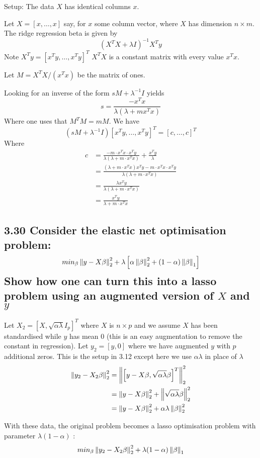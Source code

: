 Setup: The data $X$ has identical columns $x$.

Let $X = [x, \dots, x]$ say, for $x$ some column vector, where $X$ has dimension $n \times m$.
The ridge regression beta is given by 
$$\left(X^T X + \lambda I\right)^{-1} X^T y$$
Note $X^T y = [x^T y, \dots, x^T y]^T$
$X^T X$ is a constant matrix with every value $x^T x$.
 
Let $M = X^T X / (x^T x)$ be the matrix of ones.
 
Looking for an inverse of the form $s M + \lambda^{-1} I$ yields 
$$s = \frac {-x^T x}{\lambda(\lambda + m x^T x)}$$
Where one uses that $M^T M = m M$.
 We have $$(sM + \lambda^{-1} I) [x^T y, \dots, x^T y]^T = [c, \dots, c]^T$$
 Where 
 \begin{align*}
     c &= \frac {-m \cdot x^T x\cdot x^T y}{\lambda (\lambda + m\cdot x^T x)}  + \frac{x^T y}{\lambda}\\
     &= \frac {(\lambda + m\cdot x^T x) x^T y -m \cdot x^T x\cdot x^T y}{\lambda (\lambda + m\cdot x^T x)} \\
     &= \frac {\lambda x^T y}{\lambda (\lambda + m\cdot x^T x)} \\
     &= \frac { x^T y}{ \lambda + m\cdot x^T x} 
 \end{align*}
 
 


\subsection*{3.30 Consider the elastic net optimisation problem:
$$ min_\beta \left\lVert y - X \beta\right\rVert_2^2 + \lambda \left[ \alpha \left\lVert\beta\right\rVert_2^2 + (1-\alpha) \left\lVert\beta\right\rVert_1\right]$$
Show how one can turn this into a lasso problem using an augmented version of $X$ and $y$}

Let $X_2 = [X, \sqrt{\alpha \lambda}  I_p]^T$ where $X$ is $n \times p$ and we assume $X$ has been standardised while $y$ has mean $0$ (this is an easy augmentation to remove the constant in regression).
Let $y_2 = [y, 0]$ where we have augmented $y$ with $p$ additional zeros. This is the setup in 3.12 except here we use $\alpha \lambda$ in place of $\lambda$
\begin{align*}
    \left\lVert y_2 - X_2 \beta\right\rVert_2^2 &= \left\lVert\left[y - X \beta, \sqrt{\alpha \lambda} \beta \right]^T\right\rVert_2^2\\
    &= \left\lVert y - X \beta\right\rVert_2^2 + \left\lVert\sqrt{\alpha \lambda} \beta\right\rVert_2^2\\
    &= \left\lVert y - X \beta\right\rVert_2^2 + \alpha \lambda \left\lVert\beta\right\rVert_2^2\\
\end{align*}

With these data, the original problem becomes a lasso optimisation problem with parameter $\lambda (1-\alpha)$ :
$$min_\beta \left\lVert y_2 - X_2 \beta\right\rVert_2^2 + \lambda (1-\alpha) \left\lVert\beta\right\rVert_1$$